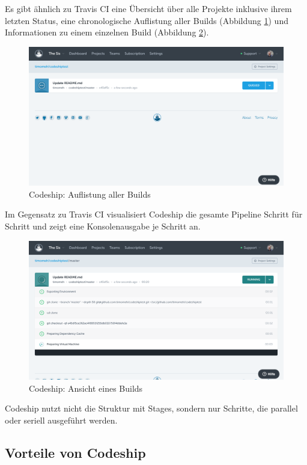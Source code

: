 Es gibt ähnlich zu Travis CI eine Übersicht über alle Projekte inklusive ihrem letzten Status, eine chronologische Auflistung aller Builds (Abbildung \ref{fig:codeship-builds}) und Informationen zu einem einzelnen Build (Abbildung \ref{fig:codeship-build-details}).

\begin{figure}[h]
  \caption{Codeship: Auflistung aller Builds}
  \label{fig:codeship-builds}
  \includegraphics[width=.8\textwidth]{assets/codeship-builds}
\end{figure}

Im Gegensatz zu Travis CI visualisiert Codeship die gesamte Pipeline Schritt für Schritt und zeigt eine Konsolenausgabe je Schritt an.

\begin{figure}[h]
  \caption{Codeship: Ansicht eines Builds}
  \label{fig:codeship-build-details}
  \includegraphics[width=.8\textwidth]{assets/codeship-build-details}
\end{figure}

Codeship nutzt nicht die Struktur mit Stages, sondern nur Schritte, die parallel oder seriell ausgeführt werden.

\subsection*{Vorteile von Codeship}


